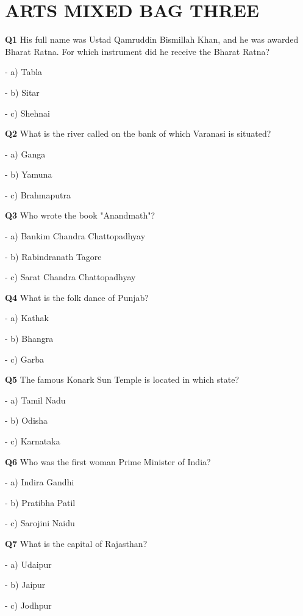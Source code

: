 \section{ARTS MIXED BAG THREE}

\textbf{Q1} His full name was Ustad Qamruddin Bismillah Khan, and he was awarded Bharat Ratna. For which instrument did he receive the Bharat Ratna?\par
\quad - a) Tabla\par
\quad - b) Sitar\par
\quad - c) Shehnai\par

\textbf{Q2} What is the river called on the bank of which Varanasi is situated?\par
\quad - a) Ganga\par
\quad - b) Yamuna\par
\quad - c) Brahmaputra\par

\textbf{Q3} Who wrote the book "Anandmath"?\par
\quad - a) Bankim Chandra Chattopadhyay\par
\quad - b) Rabindranath Tagore\par
\quad - c) Sarat Chandra Chattopadhyay\par

\textbf{Q4} What is the folk dance of Punjab?\par
\quad - a) Kathak\par
\quad - b) Bhangra\par
\quad - c) Garba\par

\textbf{Q5} The famous Konark Sun Temple is located in which state?\par
\quad - a) Tamil Nadu\par
\quad - b) Odisha\par
\quad - c) Karnataka\par

\textbf{Q6} Who was the first woman Prime Minister of India?\par
\quad - a) Indira Gandhi\par
\quad - b) Pratibha Patil\par
\quad - c) Sarojini Naidu\par

\textbf{Q7} What is the capital of Rajasthan?\par
\quad - a) Udaipur\par
\quad - b) Jaipur\par
\quad - c) Jodhpur\par

